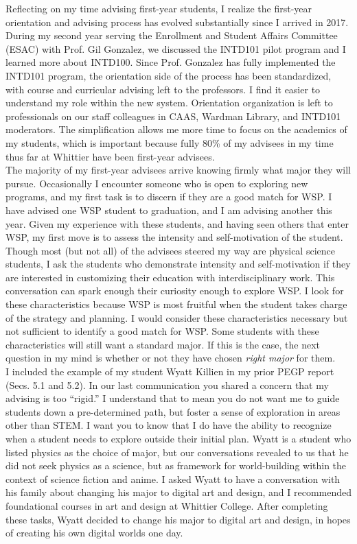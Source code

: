 \documentclass[../../main.tex]{subfiles}
\begin{document}
Reflecting on my time advising first-year students, I realize the first-year orientation and advising process has evolved substantially since I arrived in 2017.  During my second year serving the Enrollment and Student Affairs Committee (ESAC) with Prof. Gil Gonzalez, we discussed the INTD101 pilot program and I learned more about INTD100.  Since Prof. Gonzalez has fully implemented the INTD101 program, the orientation side of the process has been standardized, with course and curricular advising left to the professors.  I find it easier to understand my role within the new system.  Orientation organization is left to professionals on our staff colleagues in CAAS, Wardman Library, and INTD101 moderators.  The simplification allows me more time to focus on the academics of my students, which is important because fully 80\% of my advisees in my time thus far at Whittier have been first-year advisees.
\\
\vspace{0.25cm}
The majority of my first-year advisees arrive knowing firmly what major they will pursue.  Occasionally I encounter someone who is open to exploring new programs, and my first task is to discern if they are a good match for WSP.  I have advised one WSP student to graduation, and I am advising another this year.  Given my experience with these students, and having seen others that enter WSP, my first move is to assess the intensity and self-motivation of the student.  Though most (but not all) of the advisees steered my way are physical science students, I ask the students who demonstrate intensity and self-motivation if they are interested in customizing their education with interdisciplinary work.  This conversation can spark enough their curiosity enough to explore WSP.  I look for these characteristics because WSP is most fruitful when the student takes charge of the strategy and planning.  I would consider these characteristics necessary but not sufficient to identify a good match for WSP.  Some students with these characteristics will still want a standard major.  If this is the case, the next question in my mind is whether or not they have chosen \textit{right major} for them.
\\
\vspace{0.25cm}
I included the example of my student Wyatt Killien in my prior PEGP report (Secs. 5.1 and 5.2).  In our last communication you shared a concern that my advising is too ``rigid.''  I understand that to mean you do not want me to guide students down a pre-determined path, but foster a sense of exploration in areas other than STEM.  I want you to know that I do have the ability to recognize when a student needs to explore outside their initial plan.  Wyatt is a student who listed physics as the choice of major, but our conversations revealed to us that he did not seek physics as a science, but as framework for world-building within the context of science fiction and anime.  I asked Wyatt to have a conversation with his family about changing his major to digital art and design, and I recommended foundational courses in art and design at Whittier College.  After completing these tasks, Wyatt decided to change his major to digital art and design, in hopes of creating his own digital worlds one day.
\end{document}
